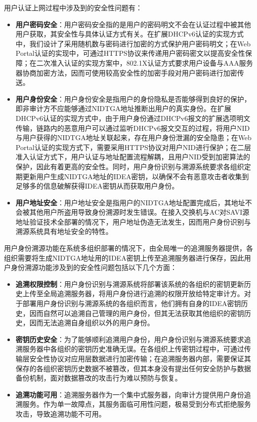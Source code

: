   用户认证上网过程中涉及到的安全性问题有：
  \begin{itemize}
    \item \textbf{用户密码安全}：用户密码安全指的是用户的密码明文不会在认证过程中被其他用户获取，其安全性与具体认证方式有关。在扩展DHCPv6认证的实现方式中，我们设计了采用随机数与密码进行加密的方式保护用户密码明文；在Web Portal认证的实现中，可通过HTTPS协议来传递用户密码密文以提高安全性保障；在二次准入认证的实现方案中，802.1X认证方式要求用户设备与AAA服务器协商加密方法，因而可使用较高安全性的加密手段对用户密码进行加密传送。
    \item \textbf{用户身份安全}：用户身份安全是指用户的身份隐私是否能够得到良好的保护，即非审计方不应能够通过NIDTGA地址推断出用户的真实身份。在扩展DHCPv6认证的实现方式中，由于用户身份通过DHCPv6报文的扩展选项明文传输，链路内的恶意用户可以通过监听DHCPv6报文交互的过程，将用户NID与用户获得的NIDTGA地址关联起来，存在用户身份泄漏的安全隐患；在Web Portal认证的实现方式下，需要采用HTTPS协议对用户NID进行保护；在二层准入认证方式下，用户认证与地址配置流程解耦，且用户NID受到加密算法的保护，因此有着更高的安全性。同时，用户身份识别与溯源系统要求各组织定期更新用户生成NIDTGA地址的IDEA密钥，以确保不会有恶意攻击者收集到足够多的信息破解获得IDEA密钥从而获取用户身份。
    \item \textbf{用户地址安全}：用户地址安全是指用户的NIDTGA地址配置完成后，其地址不会被其他用户所盗用导致身份溯源时发生错误。在接入交换机与AC对SAVI源地址验证技术全部署的情况下，用户地址伪造无法发生，因而用户身份识别与溯源系统具有地址安全的特性。
  \end{itemize}

  用户身份溯源功能在系统多组织部署的情况下，由全局唯一的追溯服务器提供，各组织需要将生成NIDTGA地址用的IDEA密钥上传至追溯服务器进行保存，因此用户身份溯源功能涉及到的安全性问题包括以下几个方面：
  \begin{itemize}
    \item \textbf{追溯权限控制}：用户身份识别与溯源系统将部署该系统的各组织的密钥更新历史上传至全局追溯服务器，将用户身份进行追溯的权限开放给特定审计方。对于部署用户身份识别与溯源系统的各组织而言，他们拥有自身的IDEA密钥历史，因而自然可以追溯自己管理的用户身份，但其无法获取其他组织的密钥历史，因而无法追溯自身组织以外的用户身份。
    \item \textbf{密钥历史安全}：为了能够顺利追溯用户身份，用户身份识别与溯源系统要求追溯服务器中各组织的密钥历史准确无误。在各组织上传密钥过程中，可通过传输层安全性协议对应用层数据进行加密传输；在追溯服务器内部，需要保证其保存的各组织密钥历史数据不被篡改，但其本身没有提出任何安全防护与数据备份机制，面对数据篡改的攻击行为难以预防与恢复。
    \item \textbf{追溯功能可用}：追溯服务器作为一个集中式服务器，向审计方提供用户身份追溯服务。作为单一故障点，其服务面临可用性问题，极易受到分布式拒绝服务攻击，导致追溯功能不可用。
  \end{itemize}

